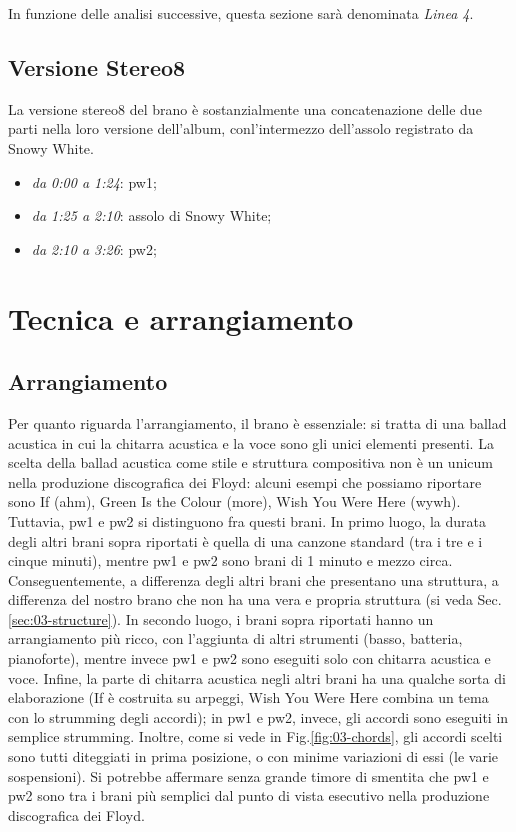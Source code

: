 \documentclass[class=book, crop=false, oneside, 12pt]{standalone}
\begin{document}
    In funzione delle analisi successive, questa sezione sarà denominata \emph{Linea 4}.

    \subsection{Versione Stereo8}
    La versione stereo8 del brano è sostanzialmente una concatenazione delle due parti nella loro versione dell'album, conl'intermezzo dell'assolo registrato da Snowy White. 

    \begin{itemize}
        \item \emph{da 0:00 a 1:24}: \acrlong{pw1};
        \item \emph{da 1:25 a 2:10}: assolo di Snowy White;
        \item \emph{da 2:10 a 3:26}: \acrlong{pw2};
    \end{itemize}

    \section{Tecnica e arrangiamento}
    \label{sec:03-arrangement}

    \subsection{Arrangiamento}
    Per quanto riguarda l'arrangiamento, il brano è essenziale: si tratta di una ballad acustica in cui la chitarra acustica e la voce sono gli unici elementi presenti. La scelta della ballad acustica come stile e struttura compositiva non è un unicum nella produzione discografica dei Floyd: alcuni esempi che possiamo riportare sono If (\acrshort{ahm}), Green Is the Colour (\acrshort{more}), Wish You Were Here (\acrshort{wywh}). Tuttavia, \acrshort{pw1} e \acrshort{pw2} si distinguono fra questi brani. In primo luogo, la durata degli altri brani sopra riportati è quella di una canzone standard (tra i tre e i cinque minuti), mentre \acrshort{pw1} e \acrshort{pw2} sono brani di 1 minuto e mezzo circa. Conseguentemente, a differenza  degli altri brani che presentano una struttura, a differenza del nostro brano che non ha una vera e propria struttura (si veda Sec.\ref{sec:03-structure}). In secondo luogo, i brani sopra riportati hanno un arrangiamento più ricco, con l'aggiunta di altri strumenti (basso, batteria, pianoforte), mentre invece \acrshort{pw1} e \acrshort{pw2} sono eseguiti solo con chitarra acustica e voce. Infine, la parte di chitarra acustica negli altri brani ha una qualche sorta di elaborazione (If è costruita su arpeggi, Wish You Were Here combina un tema con lo strumming degli accordi); in \acrshort{pw1} e \acrshort{pw2}, invece, gli accordi sono eseguiti in semplice strumming. Inoltre, come si vede in Fig.\ref{fig:03-chords}, gli accordi scelti sono tutti diteggiati in prima posizione, o con minime variazioni di essi (le varie sospensioni). Si potrebbe affermare senza grande timore di smentita che \acrshort{pw1} e \acrshort{pw2} sono tra i brani più semplici dal punto di vista esecutivo nella produzione discografica dei Floyd.
    
\end{document}
